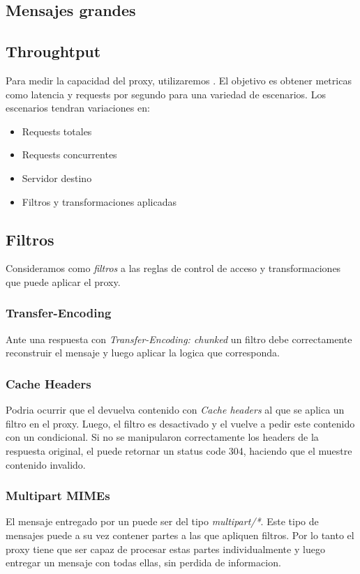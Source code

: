 \documentclass[11pt,a4paper,titlepage]{article}
\begin{document}
\subsection{Mensajes grandes}

\subsection{Throughtput}
Para medir la capacidad del proxy, utilizaremos .
El objetivo es obtener metricas como latencia y requests por segundo para una variedad de escenarios.
Los escenarios tendran variaciones en: 
\begin{itemize}
    \item Requests totales
    \item Requests concurrentes
    \item Servidor destino
    \item Filtros y transformaciones aplicadas
\end{itemize}

\subsection{Filtros}
Consideramos como \textit{filtros} a las reglas de control de acceso y transformaciones que puede aplicar el proxy.

\subsubsection{Transfer-Encoding}
Ante una respuesta con \textit{Transfer-Encoding: chunked} un filtro debe correctamente reconstruir el mensaje y luego aplicar la logica que corresponda.

\subsubsection{Cache Headers}
Podria ocurrir que el \os devuelva contenido con \textit{Cache headers} al que se aplica un filtro en el proxy.
Luego, el filtro es desactivado y el \ua vuelve a pedir este contenido con un  condicional.
Si no se manipularon correctamente los headers de la respuesta original, el \os puede retornar un status code 304, haciendo que el \ua muestre contenido invalido.

\subsubsection{Multipart MIMEs}
El mensaje entregado por un \os puede ser del tipo \textit{multipart/*}.
Este tipo de mensajes puede a su vez contener partes a las que apliquen filtros.
Por lo tanto el proxy tiene que ser capaz de procesar estas partes individualmente y luego entregar un mensaje con todas ellas, sin perdida de informacion.

\end{document}
